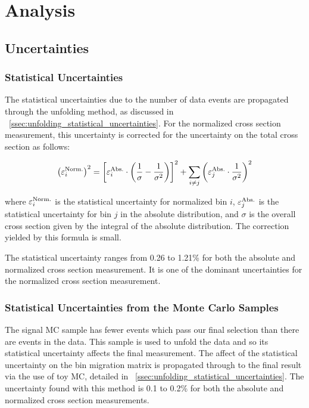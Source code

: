 \chapter{Analysis}
\label{chapter:analysis}

\section{Uncertainties}
\label{sec:uncertainties}


\subsection{Statistical Uncertainties}
\label{ssec:stat_uncertainty}

The statistical uncertainties due to the number of data events are propagated
through the unfolding method, as discussed in
\SEC~\ref{ssec:unfolding_statistical_uncertainties}. For the normalized cross
section measurement, this uncertainty is corrected for the uncertainty on the
total cross section as follows:

\begin{equation} \label{eq:stat}
    \left( \varepsilon^{\text{Norm.}}_{i} \right)^{2}
    =
    \left[
    \varepsilon^{\text{Abs.}}_{i} \cdot
        \left(
            \frac{1}{\sigma} - \frac{1}{\sigma^{2}}
        \right)
    \right]^{2}
    +
    \sum_{i \ne j}
    \left(
        \varepsilon^{\text{Abs.}}_{j} \cdot \frac{1}{\sigma^{2}}
    \right)^{2}
\end{equation}

where $\varepsilon^{\text{Norm.}}_{i}$ is the statistical uncertainty for normalized bin $i$,
$\varepsilon^{\text{Abs.}}_{j}$ is the statistical uncertainty for bin $j$ in the absolute
distribution, and $\sigma$ is the overall cross section given by the integral
of the absolute distribution. The correction yielded by this formula is small.

The statistical uncertainty ranges from 0.26 to 1.21\% for both the absolute
and normalized cross section measurement. It is one of the dominant
uncertainties for the normalized cross section measurement.

\subsection{Statistical Uncertainties from the Monte Carlo Samples}
\label{ssec:mc_stat_uncertainty}

The \MADGRAPH signal MC sample has fewer events which pass our final selection
than there are events in the data. This sample is used to unfold the data and
so its statistical uncertainty affects the final measurement. The affect of the
statistical uncertainty on the bin migration matrix is propagated through to
the final result via the use of toy MC, detailed in
\SEC~\ref{ssec:unfolding_statistical_uncertainties}. The uncertainty found with
this method is 0.1 to 0.2\% for both the absolute and normalized cross section
measurements.

